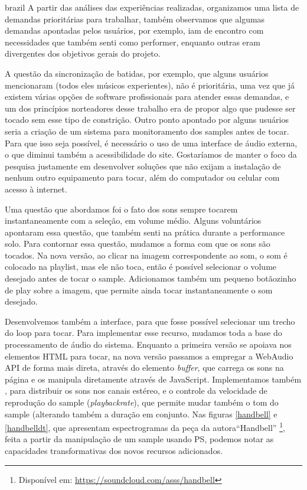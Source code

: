 \begin{otherlanguage*}{brazil}
 A partir das análises das experiências realizadas, organizamos uma lista de demandas prioritárias para trabalhar, também observamos que algumas demandas apontadas pelos usuários, por exemplo, iam de encontro com necessidades que também senti como performer, enquanto outras eram divergentes dos objetivos gerais do projeto.

 A questão da sincronização de batidas, por exemplo, que alguns usuários mencionaram (todos eles músicos experientes), não é prioritária, uma vez que já existem várias opções de software profissionais para atender essas demandas, e um dos princípios norteadores desse trabalho era de propor algo que pudesse ser tocado sem esse tipo de constrição. Outro ponto apontado por alguns usuários seria a criação de um sistema para monitoramento dos samples antes de tocar. Para que isso seja possível, é necessário o uso de uma interface de áudio externa, o que diminui também a acessibilidade do site. Gostaríamos de manter o foco da pesquisa justamente em desenvolver soluções que não exijam a instalação de nenhum outro equipamento para tocar, além do computador ou celular com acesso à internet. 

 Uma questão que abordamos foi o fato dos sons sempre tocarem instantaneamente com a seleção, em volume médio. Alguns voluntários apontaram essa questão, que também senti na prática durante a performance solo. Para contornar essa questão, mudamos a forma com que os sons são tocados. Na nova versão, ao clicar na imagem correspondente ao som, o som é colocado na playlist, mas ele não toca, então é possível selecionar o volume desejado antes de tocar o sample. Adicionamos também um pequeno botãozinho de play sobre a imagem, que permite ainda tocar instantaneamente o som desejado.

 Desenvolvemos também a interface, para que fosse possível selecionar um trecho do loop para tocar. Para implementar esse recurso, mudamos toda a base do processamento de áudio do sistema. Enquanto a primeira versão se apoiava nos elementos HTML para tocar, na nova versão passamos a empregar a WebAudio API de forma mais direta, através do elemento \emph{buffer}, que carrega os sons na página e os manipula diretamente através de JavaScript. Implementamos também , para distribuir os sons nos canais estéreo, e o controle da velocidade de reprodução do sample (\emph{playbackrate}), que permite mudar também o tom do sample (alterando também a duração em conjunto. Nas figuras \ref{handbell} e \ref{handbelldt}, que apresentam espectrogramas da peça da autora``Handbell'' \footnote{Disponível em: \url{https://soundcloud.com/asss/handbell}}, feita a partir da manipulação de um sample usando PS, podemos notar as capacidades transformativas dos novos recursos adicionados. 




\end{otherlanguage*}
